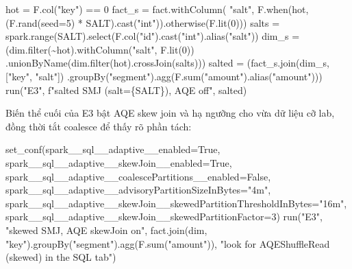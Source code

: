\documentclass[
  12pt,
  a4paper,
]{report}
\newenvironment{Shaded}{}{}
\newcommand{\BuiltInTok}[1]{\textcolor[rgb]{0.00,0.50,0.00}{#1}}
\newcommand{\DecValTok}[1]{\textcolor[rgb]{0.25,0.63,0.44}{#1}}
\newcommand{\NormalTok}[1]{#1}
\newcommand{\OperatorTok}[1]{\textcolor[rgb]{0.40,0.40,0.40}{#1}}
\newcommand{\SpecialCharTok}[1]{\textcolor[rgb]{0.25,0.44,0.63}{#1}}
\newcommand{\SpecialStringTok}[1]{\textcolor[rgb]{0.73,0.40,0.53}{#1}}
\newcommand{\StringTok}[1]{\textcolor[rgb]{0.25,0.44,0.63}{#1}}
\newcommand{\VariableTok}[1]{\textcolor[rgb]{0.10,0.09,0.49}{#1}}
\begin{document}
\begin{Shaded}
\begin{Highlighting}[]
\NormalTok{hot }\OperatorTok{=}\NormalTok{ F.col(}\StringTok{"key"}\NormalTok{) }\OperatorTok{==} \DecValTok{0}
\NormalTok{fact\_s }\OperatorTok{=}\NormalTok{ fact.withColumn(}
    \StringTok{"salt"}\NormalTok{, F.when(hot, (F.rand(seed}\OperatorTok{=}\DecValTok{5}\NormalTok{) }\OperatorTok{*}\NormalTok{ SALT).cast(}\StringTok{"int"}\NormalTok{)).otherwise(F.lit(}\DecValTok{0}\NormalTok{)))}
\NormalTok{salts }\OperatorTok{=}\NormalTok{ spark.}\BuiltInTok{range}\NormalTok{(SALT).select(F.col(}\StringTok{"id"}\NormalTok{).cast(}\StringTok{"int"}\NormalTok{).alias(}\StringTok{"salt"}\NormalTok{))}
\NormalTok{dim\_s }\OperatorTok{=}\NormalTok{ (dim.}\BuiltInTok{filter}\NormalTok{(}\OperatorTok{\textasciitilde{}}\NormalTok{hot).withColumn(}\StringTok{"salt"}\NormalTok{, F.lit(}\DecValTok{0}\NormalTok{))}
\NormalTok{         .unionByName(dim.}\BuiltInTok{filter}\NormalTok{(hot).crossJoin(salts)))}
\NormalTok{salted }\OperatorTok{=}\NormalTok{ (fact\_s.join(dim\_s, [}\StringTok{"key"}\NormalTok{, }\StringTok{"salt"}\NormalTok{])}
\NormalTok{          .groupBy(}\StringTok{"segment"}\NormalTok{).agg(F.}\BuiltInTok{sum}\NormalTok{(}\StringTok{"amount"}\NormalTok{).alias(}\StringTok{"amount"}\NormalTok{)))}
\NormalTok{run(}\StringTok{"E3"}\NormalTok{, }\SpecialStringTok{f"salted SMJ (salt=}\SpecialCharTok{\{}\NormalTok{SALT}\SpecialCharTok{\}}\SpecialStringTok{), AQE off"}\NormalTok{, salted)}
\end{Highlighting}
\end{Shaded}

Biến thể cuối của E3 bật AQE skew join và hạ ngưỡng cho vừa dữ liệu cỡ
lab, đồng thời tắt coalesce để thấy rõ phần tách:

\begin{Shaded}
\begin{Highlighting}[]
\NormalTok{set\_conf(spark\_\_sql\_\_adaptive\_\_enabled}\OperatorTok{=}\VariableTok{True}\NormalTok{,}
\NormalTok{         spark\_\_sql\_\_adaptive\_\_skewJoin\_\_enabled}\OperatorTok{=}\VariableTok{True}\NormalTok{,}
\NormalTok{         spark\_\_sql\_\_adaptive\_\_coalescePartitions\_\_enabled}\OperatorTok{=}\VariableTok{False}\NormalTok{,}
\NormalTok{         spark\_\_sql\_\_adaptive\_\_advisoryPartitionSizeInBytes}\OperatorTok{=}\StringTok{"4m"}\NormalTok{,}
\NormalTok{         spark\_\_sql\_\_adaptive\_\_skewJoin\_\_skewedPartitionThresholdInBytes}\OperatorTok{=}\StringTok{"16m"}\NormalTok{,}
\NormalTok{         spark\_\_sql\_\_adaptive\_\_skewJoin\_\_skewedPartitionFactor}\OperatorTok{=}\DecValTok{3}\NormalTok{)}
\NormalTok{run(}\StringTok{"E3"}\NormalTok{, }\StringTok{"skewed SMJ, AQE skewJoin on"}\NormalTok{,}
\NormalTok{    fact.join(dim, }\StringTok{"key"}\NormalTok{).groupBy(}\StringTok{"segment"}\NormalTok{).agg(F.}\BuiltInTok{sum}\NormalTok{(}\StringTok{"amount"}\NormalTok{)),}
    \StringTok{"look for AQEShuffleRead (skewed) in the SQL tab"}\NormalTok{)}
\end{Highlighting}
\end{Shaded}
\end{document}
